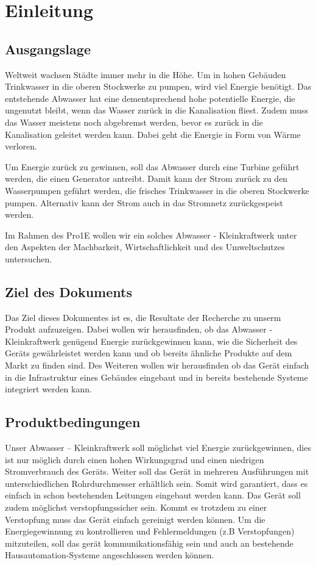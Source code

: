 \section{Einleitung}

\subsection{Ausgangslage}

Weltweit wachsen Städte immer mehr in die Höhe. Um in hohen Gebäuden Trinkwasser in die oberen Stockwerke zu pumpen, wird viel Energie benötigt. Das entstehende Abwasser hat eine dementsprechend hohe potentielle Energie, die ungenutzt bleibt, wenn das Wasser zurück in die Kanalisation fliest. Zudem muss das Wasser meistens noch abgebremst werden, bevor es zurück in die Kanalisation geleitet werden kann. Dabei geht die Energie in Form von Wärme verloren. 

Um Energie zurück zu gewinnen, soll das Abwasser durch eine Turbine geführt werden, die einen Generator antreibt. Damit kann der Strom zurück zu den Wasserpumpen geführt werden, die frisches Trinkwasser in die oberen Stockwerke pumpen. Alternativ kann der Strom auch in das Stromnetz zurückgespeist werden. 

Im Rahmen des Pro1E wollen wir ein solches Abwasser - Kleinkraftwerk unter den Aspekten der Machbarkeit, Wirtschaftlichkeit und des Umweltschutzes untersuchen.  

\subsection{Ziel des Dokuments}

Das Ziel dieses Dokumentes ist es, die Resultate der Recherche zu unserm Produkt aufzuzeigen. Dabei wollen wir herausfinden, ob das Abwasser - Kleinkraftwerk genügend Energie zurückgewinnen kann, wie die Sicherheit des Geräts gewährleistet werden kann und ob bereits ähnliche Produkte auf dem Markt zu finden sind. Des Weiteren wollen wir herausfinden ob das Gerät einfach in die Infrastruktur eines Gebäudes eingebaut und in bereits bestehende Systeme integriert werden kann.

\subsection{Produktbedingungen}

Unser Abwasser – Kleinkraftwerk soll möglichst viel Energie zurückgewinnen, dies ist nur möglich durch einen hohen Wirkungsgrad und einen niedrigen Stromverbrauch des Geräts. Weiter soll das Gerät in mehreren Ausführungen mit unterschiedlichen Rohrdurchmesser erhältlich sein. Somit wird garantiert, dass es einfach in schon bestehenden Leitungen eingebaut werden kann. Das Gerät soll zudem möglichst verstopfungssicher sein. Kommt es trotzdem zu einer Verstopfung muss das Gerät einfach gereinigt werden können. Um die Energiegewinnung zu kontrollieren und Fehlermeldungen (z.B Verstopfungen) mitzuteilen, soll das gerät kommunikationsfähig sein und auch an bestehende Hausautomation-Systeme angeschlossen werden können.


